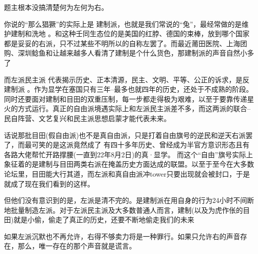 \begin{zhihuanswer}
题主根本没搞清楚何为左何为右。

你说的``那么猖獗''的实际上是
建制派，也就是我们常说的``兔''，最经常做的是维护建制和洗地
。和这种壬同生态位的是美国的红脖、德国的束棒，放到哪个国家都是妥妥的右派，只不过某些不明所以的自称左罢了。而最近莆田医院、上海团购、深圳鲶鱼和让越来越多人看清了建制是个什么货色，那建制派的声音自然小多了

而左派民主派
代表揭示历史、正本清源，民主、文明、平等、公正的诉求，是反建制派
。作为显学在塞国只有三年--最多也就四年的历史，还处于不成熟的阶段。同时还要面对建制和目田的双重压制，每一步都走得极为艰难，以至于要靠传递星火的方式运行。真正的自由派境遇实际上和左派民主派差不多，而这两派的联合--民自阵营、文艺复兴和民主派思想启蒙才能代表未来。

话说那批目田(假自由派)也不是真自由派，只是打着自由旗号的逆民和逆天右派罢了，而最可笑的是这派竟然成了
有四十多年历史、曾经成为半官方意识形态且有各路大佬帮忙开路撑腰(一直到22年8月2日)的真·显学。
而这个``自由''旗号实际上象征着的是建制与目田两类右派在掩盖历史方面达成的联盟。以至于至今在大多数论坛里，目田能大行其道，而左派和真自由派冲tower只要出现就会被封口，于是就成了现在我们看到的这样。

但他们没有意识到的是，左派是清不完的。是建制派在用自身的行为24小时不间断地批量制造左派。对于左派民主派及大多数普通人而言，建制(以及为虎作伥的目田)就是小偷，偷走了真正的历史，还要不断地偷走我们的未来

如果左派沉默也不再允许，右得不够卖力将是一种罪行。如果只允许右的声音存在，那么，唯一存在的那个声音就是谎言。
\end{zhihuanswer}
